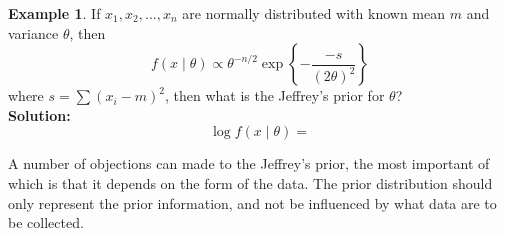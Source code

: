 \documentclass[lecture,12pt,]{pcms-l}
\numberwithin{section}{chapter}
\numberwithin{equation}{chapter}
\theoremstyle{plain}
\theoremstyle{definition}
\newtheorem{example}{Example}[section]
\theoremstyle{definition}
\begin{document}
\begin{enumerate}
\begin{example}
If $x_1,x_2,...,x_n$ are normally distributed with known mean $m$ and variance $\theta$, then
\begin{equation}
f(x \mid \theta) \propto \theta^{-n/2}\exp \left \{  - \frac{-s}{(2 \theta)^2}\right \}
\end{equation}
where $s=\sum (x_i -m)^2$, then what is the Jeffrey's prior for $\theta$?
\\
\textbf{Solution:}\\
\begin{equation}
\log f(x \mid \theta) =
\end{equation}
\end{example}

A number of objections can made to the Jeffrey's prior, the most important of which is that it depends on the form of the data. The prior distribution should only represent the prior information, and not be influenced by what data are to be collected.
\\


\end{enumerate}
\end{document}

